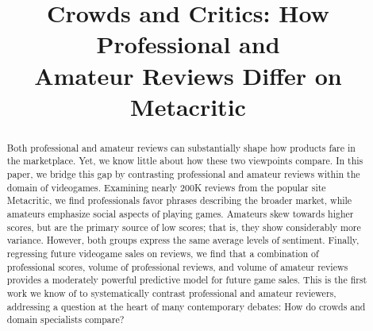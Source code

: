 \documentclass{sig-alternate}
\begin{document}
\skip{}\bigskipamount     %
\renewcommand*{\footnoterule}{
  \kern-3pt
  \hrule width 2in
  \kern 2.6pt
  \vspace{\smallskipamount}       %
}
\renewcommand\arraystretch{1.3}

\makeatletter
\def\url@leostyle{%
  \@ifundefined{selectfont}{\def\UrlFont{\sf}}{\def\UrlFont{\small\ttfamily}}}
\makeatother



\markright{\today}


\title{Crowds and Critics: How Professional and \\ [0.5ex]Amateur Reviews
Differ on Metacritic}
\author{
}
\maketitle

\begin{abstract}
Both professional and amateur reviews can substantially shape
how products fare in the marketplace. Yet, we know little about how these two
viewpoints compare. 
In this paper, we bridge this gap by contrasting professional and
amateur reviews within the 
domain of videogames. Examining nearly 200K 
reviews from the popular site Metacritic, we find
professionals favor phrases describing the broader market, while
amateurs emphasize social aspects of playing games. Amateurs skew
towards higher scores, but are the primary source of low
scores; that is, they show considerably more variance. 
However, both groups express the same average levels of sentiment.
Finally, regressing future videogame sales on reviews, we
find that a combination of professional scores, volume of professional
reviews, and volume of amateur reviews provides a moderately powerful
predictive model for future game sales. This is the first work
we know of to systematically contrast professional and amateur
reviewers, addressing a question at the heart
of many contemporary debates: How do crowds and domain
specialists compare?

\end{abstract}
\end{document}

